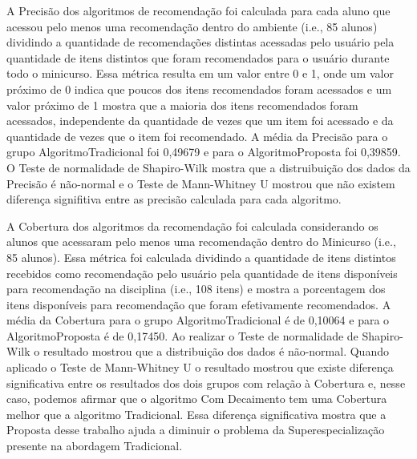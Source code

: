A Precisão dos algoritmos de recomendação foi calculada para cada aluno que acessou pelo menos uma recomendação dentro do
ambiente (i.e., 85 alunos) dividindo a quantidade de recomendações distintas acessadas pelo usuário pela quantidade de
itens distintos que foram recomendados para o usuário durante todo o minicurso. Essa métrica resulta em um valor entre
0 e 1, onde um valor próximo de 0 indica que poucos dos itens recomendados foram acessados e um valor próximo de 1
mostra que a maioria dos itens recomendados foram acessados, independente da quantidade de vezes que um item foi
acessado e da quantidade de vezes que o item foi recomendado. A média da Precisão para o grupo AlgoritmoTradicional foi
0,49679 e para o AlgoritmoProposta foi 0,39859. O Teste de normalidade de Shapiro-Wilk mostra que a distruibuição dos
dados da Precisão é não-normal e o Teste de Mann-Whitney U mostrou que não existem diferença signifitiva entre as
precisão calculada para cada algoritmo.

A Cobertura dos algoritmos da recomendação foi calculada considerando os alunos que acessaram pelo menos uma recomendação
dentro do Minicurso (i.e., 85 alunos). Essa métrica foi calculada dividindo a quantidade de itens distintos recebidos
como recomendação pelo usuário pela quantidade de itens disponíveis para recomendação na disciplina (i.e., 108 itens) e mostra
a porcentagem dos itens disponíveis para recomendação que foram efetivamente recomendados. A média da Cobertura para o
grupo AlgoritmoTradicional é de 0,10064 e para o AlgoritmoProposta é de 0,17450. Ao realizar o Teste de
normalidade de Shapiro-Wilk o resultado mostrou que a distribuição dos dados é não-normal. Quando aplicado o Teste de Mann-Whitney
U o resultado mostrou que existe diferença significativa entre os resultados dos dois grupos com relação à Cobertura e, nesse caso,
podemos afirmar que o algoritmo Com Decaimento tem uma Cobertura melhor que a algoritmo Tradicional. Essa diferença significativa
mostra que a Proposta desse trabalho ajuda a diminuir o problema da Superespecialização presente na abordagem Tradicional.


